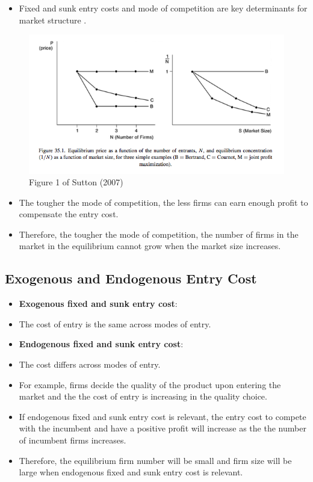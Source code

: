 \documentclass[
]{book}
\providecommand{\tightlist}{%
  \setlength{\itemsep}{0pt}\setlength{\parskip}{0pt}}
\begin{document}
\begin{itemize}
\tightlist
\item
  Fixed and sunk entry costs and mode of competition are key determinants for market structure \citep{suttonChapter35Market2007}.
\end{itemize}

\begin{figure}

{\centering \includegraphics[width=0.8\linewidth]{figuretable/entrycost} 

}

\caption{Figure 1 of Sutton (2007)}\label{fig:unnamed-chunk-26}
\end{figure}

\begin{itemize}
\tightlist
\item
  The tougher the mode of competition, the less firms can earn enough profit to compensate the entry cost.
\item
  Therefore, the tougher the mode of competition, the number of firms in the market in the equilibrium cannot grow when the market size increases.
\end{itemize}

\hypertarget{exogenous-and-endogenous-entry-cost}{%
\subsection{Exogenous and Endogenous Entry Cost}\label{exogenous-and-endogenous-entry-cost}}

\begin{itemize}
\tightlist
\item
  \textbf{Exogenous fixed and sunk entry cost}:
\item
  The cost of entry is the same across modes of entry.
\item
  \textbf{Endogenous fixed and sunk entry cost}:
\item
  The cost differs across modes of entry.
\item
  For example, firms decide the quality of the product upon entering the market and the the cost of entry is increasing in the quality choice.
\item
  If endogenous fixed and sunk entry cost is relevant, the entry cost to compete with the incumbent and have a positive profit will increase as the the number of incumbent firms increases.
\item
  Therefore, the equilibrium firm number will be small and firm size will be large when endogenous fixed and sunk entry cost is relevant.
\end{itemize}
\end{document}
